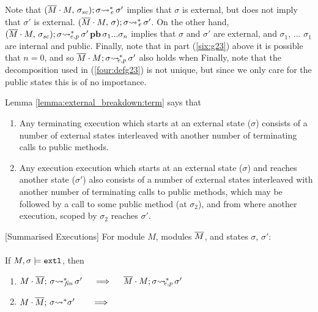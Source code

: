 {{\vspace{.1cm}

Note   that 
${(\overline{M}\cdot M,\, {\sigma_{sc}}); \sigma{\rightsquigarrow^*}\!\!_{e}\, \sigma'}$ implies that $\sigma$ is external, but does not
imply that $\sigma'$ is external.
${(\overline{M}\cdot M,\, {\sigma}); \sigma{\rightsquigarrow^*}\!\!_{e}\, \sigma'}$. 
On the other hand, $(\overline{M}\cdot M,\, {\sigma_{sc}}); \sigma {{\rightsquigarrow^*}} \!\!\!_{e,p}\, \sigma'\, {\textbf{pb}}\, {\sigma_1...\sigma_n}$ implies that $\sigma$ and $\sigma'$ are external, and  $\sigma_1$, ... $\sigma_1$  are internal and public.
Finally, note that   in part (\ref{six:g23}) above it is possible that $n=0$, and so 
$\overline{M}\cdot M; \sigma {\rightsquigarrow^*}\!\!\!\!_{e,p}\, \sigma' $  also holds when
Finally, note that the decomposition used in (\ref{four:defg23}) is not unique, but since we only care for the public states this is of no importance.

\vspace{.2cm}

Lemma \ref{lemma:external_breakdown:term} says that\\
\begin{enumerate}
\item
Any terminating execution which starts at an external state ($\sigma$) consists of a number of external states interleaved with another number of terminating calls to public methods.
\item
Any execution execution which starts at an external state ($\sigma$) and reaches another state ($\sigma'$) also consists of a number of external states interleaved with another number of terminating calls to public methods, which may be followed by a call to some public method (at $\sigma_2$), and from where another execution, scoped by $\sigma_2$  reaches $\sigma'$.
\end{enumerate}


 \begin{auxLemma}
\label{lemma:external_breakdown:term}[Summarised Executions]
For   module $M$, modules $\overline{M}$, and states $\sigma$, $\sigma'$:
\\
\\
If $M,\sigma \models \mbox{\normalfont{\texttt{extl}}}$, then
\begin{enumerate}
\item
\label{lemma:external_breakdown:term:one}
$\leadstoBoundedStarFin {M\cdot \Mtwo}  {\sigma}  {\sigma'}  \ \ \  \ 
\Longrightarrow \ \ \  \ \leadstoBoundedExtPub {\Mtwo\cdot M}    {\sigma}  {\sigma'}$
\item
\label{lemma:external_breakdown:two}
$M\cdot \overline{M};\, {\sigma} {\rightsquigarrow^*} \sigma'  \ \ \  \ \ \  
\Longrightarrow$ 


\end{enumerate}
\end{auxLemma}}}
